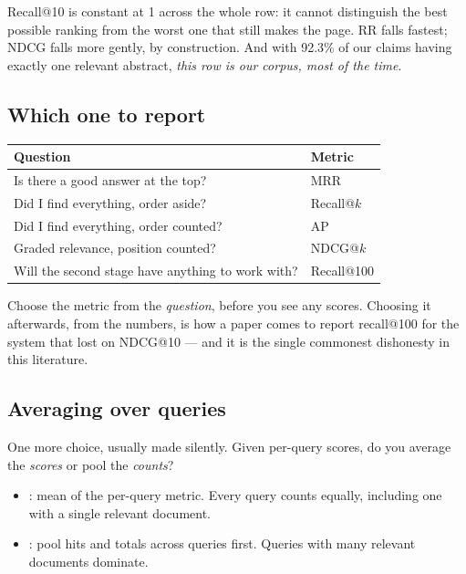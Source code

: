 \documentclass[11pt,a4paper]{article}
\begin{document}
Recall@10 is constant at 1 across the whole row: it cannot distinguish the best
possible ranking from the worst one that still makes the page. RR falls
fastest; NDCG falls more gently, by construction. And with 92.3\% of our claims
having exactly one relevant abstract, \emph{this row is our corpus, most of the
time}.

\subsection{Which one to report}

\begin{center}
\small
\begin{tabular}{ll}
\toprule
\textbf{Question} & \textbf{Metric} \\
\midrule
Is there a good answer at the top?          & MRR \\
Did I find everything, order aside?         & Recall@$k$ \\
Did I find everything, order counted?       & AP \\
Graded relevance, position counted?         & NDCG@$k$ \\
Will the second stage have anything to work with? & Recall@100 \\
\bottomrule
\end{tabular}
\end{center}

\begin{keybox}[title={The rule}]
Choose the metric from the \emph{question}, before you see any scores.
Choosing it afterwards, from the numbers, is how a paper comes to report
recall@100 for the system that lost on NDCG@10 --- and it is the single
commonest dishonesty in this literature.
\end{keybox}

\subsection{Averaging over queries}

One more choice, usually made silently. Given per-query scores, do you average
the \emph{scores} or pool the \emph{counts}?

\begin{itemize}[leftmargin=*,nosep]
  \item {}: mean of the per-query metric. Every query counts equally,
        including one with a single relevant document.
  \item {}: pool hits and totals across queries first. Queries with
        many relevant documents dominate.
\end{itemize}
\end{document}
